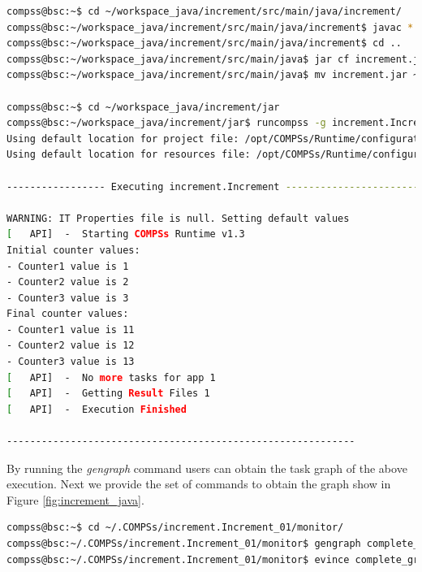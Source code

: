 \begin{lstlisting}[language=bash]
compss@bsc:~$ cd ~/workspace_java/increment/src/main/java/increment/
compss@bsc:~/workspace_java/increment/src/main/java/increment$ javac *.java
compss@bsc:~/workspace_java/increment/src/main/java/increment$ cd ..
compss@bsc:~/workspace_java/increment/src/main/java$ jar cf increment.jar increment
compss@bsc:~/workspace_java/increment/src/main/java$ mv increment.jar ~/workspace_java/increment/jar/

compss@bsc:~$ cd ~/workspace_java/increment/jar
compss@bsc:~/workspace_java/increment/jar$ runcompss -g increment.Increment 10 1 2 3
Using default location for project file: /opt/COMPSs/Runtime/configuration/xml/projects/project.xml
Using default location for resources file: /opt/COMPSs/Runtime/configuration/xml/resources/resources.xml

----------------- Executing increment.Increment --------------------------

WARNING: IT Properties file is null. Setting default values
[   API]  -  Starting COMPSs Runtime v1.3
Initial counter values:
- Counter1 value is 1
- Counter2 value is 2
- Counter3 value is 3
Final counter values:
- Counter1 value is 11
- Counter2 value is 12
- Counter3 value is 13
[   API]  -  No more tasks for app 1
[   API]  -  Getting Result Files 1
[   API]  -  Execution Finished

------------------------------------------------------------
\end{lstlisting}

By running the \textit{gengraph} command users can obtain the task graph of the above execution. Next we provide the set of commands to obtain the
graph show in Figure \ref{fig:increment_java}.

\begin{lstlisting}[language=bash]
compss@bsc:~$ cd ~/.COMPSs/increment.Increment_01/monitor/
compss@bsc:~/.COMPSs/increment.Increment_01/monitor$ gengraph complete_graph.dot
compss@bsc:~/.COMPSs/increment.Increment_01/monitor$ evince complete_graph.pdf
\end{lstlisting}

